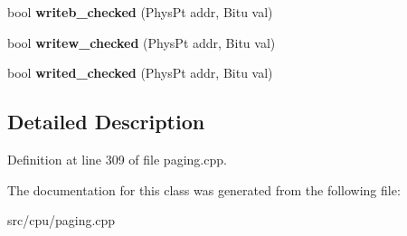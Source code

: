 \begin{DoxyCompactItemize}
\item 
\hypertarget{classPageFoilHandler_a6da0b95977688171ce76cdd7e1f9e92e}{bool {\bfseries writeb\-\_\-checked} (Phys\-Pt addr, Bitu val)}\label{classPageFoilHandler_a6da0b95977688171ce76cdd7e1f9e92e}

\item 
\hypertarget{classPageFoilHandler_a73568f447018da5957bad2ff90adbb5d}{bool {\bfseries writew\-\_\-checked} (Phys\-Pt addr, Bitu val)}\label{classPageFoilHandler_a73568f447018da5957bad2ff90adbb5d}

\item 
\hypertarget{classPageFoilHandler_ac8ea0331f5b106050c7d3ff801c4bdf3}{bool {\bfseries writed\-\_\-checked} (Phys\-Pt addr, Bitu val)}\label{classPageFoilHandler_ac8ea0331f5b106050c7d3ff801c4bdf3}

\end{DoxyCompactItemize}


\subsection{Detailed Description}


Definition at line 309 of file paging.\-cpp.



The documentation for this class was generated from the following file\-:\begin{DoxyCompactItemize}
\item 
src/cpu/paging.\-cpp\end{DoxyCompactItemize}

